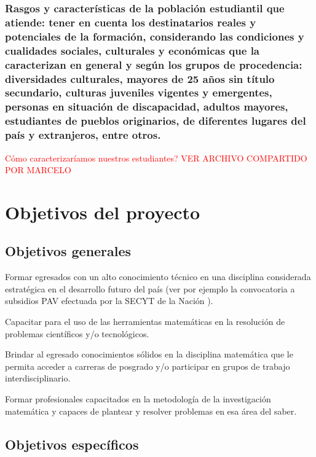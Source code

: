 \documentclass[a4paper, 12pt]{article}
\begin{document}
\subsubsection{Rasgos y características de la población estudiantil que atiende: tener en cuenta los destinatarios reales y potenciales de la formación, considerando las condiciones y cualidades sociales, culturales y económicas que la caracterizan en general y según los grupos de procedencia: diversidades culturales, mayores de 25 años sin título secundario, culturas juveniles vigentes y emergentes, personas en situación de discapacidad, adultos mayores, estudiantes de pueblos originarios, de diferentes lugares del país y extranjeros, entre otros.}

\textcolor{red}{Cómo caracterizaríamos nuestros estudiantes? VER ARCHIVO COMPARTIDO POR MARCELO}

\section{Objetivos del proyecto}
\subsection{Objetivos generales}

Formar egresados con un alto conocimiento técnico en una
disciplina considerada estratégica en el desarrollo futuro del
país (ver por ejemplo la convocatoria a subsidios PAV efectuada
por la SECYT de la Nación \cite{pav2003}).


Capacitar para el uso de las herramientas matemáticas en la
resolución de problemas científicos y/o tecnológicos.

Brindar  al egresado  conocimientos sólidos en la disciplina
matemática que le permita acceder a carreras de posgrado y/o
participar en grupos de trabajo interdisciplinario.

Formar profesionales capacitados en la metodología de la investigación matemática y capaces de plantear y resolver problemas en esa área del saber.

\subsection{Objetivos específicos}
\end{document}
